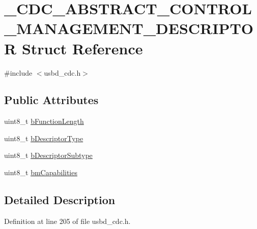 \hypertarget{struct___c_d_c___a_b_s_t_r_a_c_t___c_o_n_t_r_o_l___m_a_n_a_g_e_m_e_n_t___d_e_s_c_r_i_p_t_o_r}{}\section{\+\_\+\+C\+D\+C\+\_\+\+A\+B\+S\+T\+R\+A\+C\+T\+\_\+\+C\+O\+N\+T\+R\+O\+L\+\_\+\+M\+A\+N\+A\+G\+E\+M\+E\+N\+T\+\_\+\+D\+E\+S\+C\+R\+I\+P\+T\+OR Struct Reference}
\label{struct___c_d_c___a_b_s_t_r_a_c_t___c_o_n_t_r_o_l___m_a_n_a_g_e_m_e_n_t___d_e_s_c_r_i_p_t_o_r}


{\ttfamily \#include $<$usbd\+\_\+cdc.\+h$>$}

\subsection*{Public Attributes}
\begin{DoxyCompactItemize}
\item 
uint8\+\_\+t \hyperlink{struct___c_d_c___a_b_s_t_r_a_c_t___c_o_n_t_r_o_l___m_a_n_a_g_e_m_e_n_t___d_e_s_c_r_i_p_t_o_r_a97e809e9fd90d0da48f3fc083e6ffc01}{b\+Function\+Length}
\item 
uint8\+\_\+t \hyperlink{struct___c_d_c___a_b_s_t_r_a_c_t___c_o_n_t_r_o_l___m_a_n_a_g_e_m_e_n_t___d_e_s_c_r_i_p_t_o_r_a5a7671be987b15ea0a360d4d0ba8981c}{b\+Descriptor\+Type}
\item 
uint8\+\_\+t \hyperlink{struct___c_d_c___a_b_s_t_r_a_c_t___c_o_n_t_r_o_l___m_a_n_a_g_e_m_e_n_t___d_e_s_c_r_i_p_t_o_r_a102b3c47bb589d906fa0ba2f383a8306}{b\+Descriptor\+Subtype}
\item 
uint8\+\_\+t \hyperlink{struct___c_d_c___a_b_s_t_r_a_c_t___c_o_n_t_r_o_l___m_a_n_a_g_e_m_e_n_t___d_e_s_c_r_i_p_t_o_r_a42f90ae883dfbe07a590de4874972599}{bm\+Capabilities}
\end{DoxyCompactItemize}


\subsection{Detailed Description}


Definition at line 205 of file usbd\+\_\+cdc.\+h.



